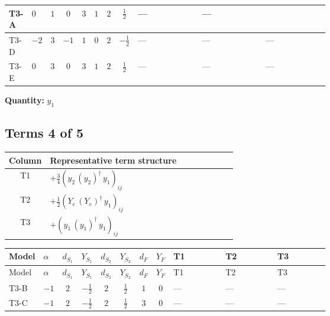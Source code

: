 \documentclass[8pt]{article}
\begin{document}
\begin{landscape}
\begin{longtable}{@{}llcccccc >{\raggedright\arraybackslash}p{0.21\linewidth} >{\raggedright\arraybackslash}p{0.21\linewidth} >{\raggedright\arraybackslash}p{0.21\linewidth}@{}}
\midrule
T3-A & $0$ & $1$ & $0$ & $3$ & $1$ & $2$ & $\frac{1}{2}$ & --- & --- & \scriptsize\adjustbox{max width=\linewidth}{$\begin{gathered} 2 T_{\nu}^{(1)} \left({y_1}\right)_{ij}\end{gathered}$} \\
\midrule
T3-D & $-2$ & $3$ & $-1$ & $1$ & $0$ & $2$ & $-\frac{1}{2}$ & --- & --- & --- \\
\midrule
T3-E & $0$ & $3$ & $0$ & $3$ & $1$ & $2$ & $\frac{1}{2}$ & --- & --- & --- \\
\midrule
\bottomrule
\end{longtable}
\clearpage
\noindent\textbf{Quantity: }$y_1$\par\smallskip
\subsection*{Terms 4 of 5}
\begin{center}
\begin{tabular}{@{}c >{\raggedright\arraybackslash}p{0.82\linewidth}@{}}
\toprule
Column & Representative term structure \\
\midrule
T1 & \(\displaystyle +\frac{3}{4} \left({y_2}\,\left({y_2}\right)^{\dagger}\,{y_1}\right)_{ij}\) \\
\midrule
T2 & \(\displaystyle +\frac{1}{2} \left({Y_e}\,\left({Y_e}\right)^{\dagger}\,{y_1}\right)_{ij}\) \\
\midrule
T3 & \(\displaystyle +\left({y_1}\,\left({y_1}\right)^{\dagger}\,{y_1}\right)_{ij}\) \\
\midrule
\bottomrule
\end{tabular}
\end{center}
\smallskip
\tiny
\begin{longtable}{@{}llcccccc >{\raggedright\arraybackslash}p{0.21\linewidth} >{\raggedright\arraybackslash}p{0.21\linewidth} >{\raggedright\arraybackslash}p{0.21\linewidth}@{}}
\toprule
Model & $\alpha$ & $d_{S_1}$ & $Y_{S_1}$ & $d_{S_2}$ & $Y_{S_2}$ & $d_F$ & $Y_F$ & T1 & T2 & T3 \\
\midrule
\endfirsthead
\toprule
Model & $\alpha$ & $d_{S_1}$ & $Y_{S_1}$ & $d_{S_2}$ & $Y_{S_2}$ & $d_F$ & $Y_F$ & T1 & T2 & T3 \\
\midrule
\endhead
T3-B & $-1$ & $2$ & $-\frac{1}{2}$ & $2$ & $\frac{1}{2}$ & $1$ & $0$ & --- & --- & --- \\
\midrule
T3-C & $-1$ & $2$ & $-\frac{1}{2}$ & $2$ & $\frac{1}{2}$ & $3$ & $0$ & --- & --- & --- \\

\end{longtable}
\end{landscape}
\end{document}
